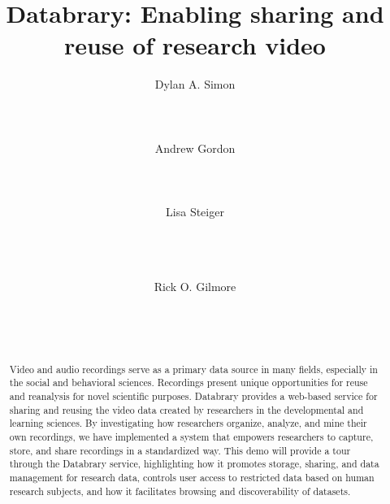 \documentclass{sig-alternate}
\begin{document}

\title{Databrary: Enabling sharing and reuse of research video}


\author{
\alignauthor
Dylan A. Simon\\
	\\
	\\
	\\
\alignauthor
Andrew Gordon\\
	\\
	\\
	\\
\alignauthor
Lisa Steiger\\
	\\
	\\
	\\
\and
Rick O. Gilmore\\
	\\
	\\
	\\
}

\maketitle

\begin{abstract}
Video and audio recordings serve as a primary data source in many fields, especially in the social and behavioral sciences.
Recordings present unique opportunities for reuse and reanalysis for novel scientific purposes.
Databrary provides a web-based service for sharing and reusing the video data created by researchers in the developmental and learning sciences.
By investigating how researchers organize, analyze, and mine their own recordings, we have implemented a system that empowers researchers to capture, store, and share recordings in a standardized way.
This demo will provide a tour through the Databrary service, highlighting how it promotes storage, sharing, and data management for research data, controls user access to restricted data based on human research subjects, and how it facilitates browsing and discoverability of datasets.
\end{abstract}
\end{document}
